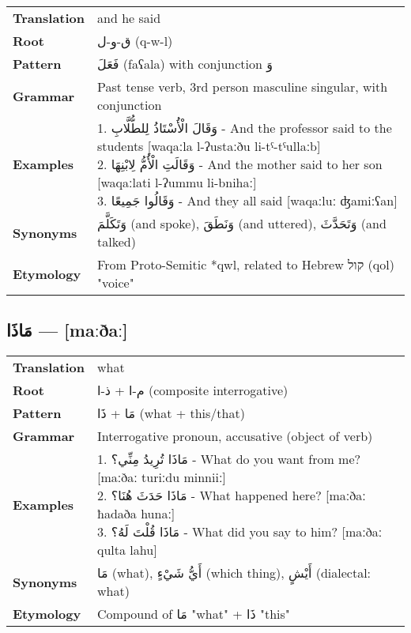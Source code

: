 \documentclass[letterpaper,12pt]{article}
\begin{document}
\begin{tabular}{p{3cm}p{10cm}}
\toprule
\textbf{Translation} & and he said \\
\textbf{Root} & \textarabic{ق-و-ل} (q-w-l) \\
\textbf{Pattern} & \textarabic{فَعَلَ} (faʕala) with conjunction \textarabic{وَ} \\
\textbf{Grammar} & Past tense verb, 3rd person masculine singular, with conjunction \\
\textbf{Examples} & \makecell[l]{\parbox{9.5cm}{
1. \textarabic{وَقَالَ الْأُسْتَاذُ لِلطُّلَّابِ} - And the professor said to the students [waqaːla l-ʔustaːðu li-tˤ-tˤullaːb]\\
2. \textarabic{وَقَالَتِ الْأُمُّ لِابْنِهَا} - And the mother said to her son [waqaːlati l-ʔummu li-bnihaː]\\
3. \textarabic{وَقَالُوا جَمِيعًا} - And they all said [waqaːluː ʤamiːʕan]
}} \\
\midrule
\textbf{Synonyms} & \textarabic{وَتَكَلَّمَ} (and spoke), \textarabic{وَنَطَقَ} (and uttered), \textarabic{وَتَحَدَّثَ} (and talked) \\
\textbf{Etymology} & From Proto-Semitic *qwl, related to Hebrew \texthebrew{קול} (qol) "voice" \\
\bottomrule
\end{tabular}

\subsection{\textarabic{مَاذَا} — [maːðaː]}

\begin{tabular}{p{3cm}p{10cm}}
\toprule
\textbf{Translation} & what \\
\textbf{Root} & \textarabic{م-ا} + \textarabic{ذ-ا} (composite interrogative) \\
\textbf{Pattern} & \textarabic{مَا} + \textarabic{ذَا} (what + this/that) \\
\textbf{Grammar} & Interrogative pronoun, accusative (object of verb) \\
\textbf{Examples} & \makecell[l]{\parbox{9.5cm}{
1. \textarabic{مَاذَا تُرِيدُ مِنِّي؟} - What do you want from me? [maːðaː turiːdu minniiː]\\
2. \textarabic{مَاذَا حَدَثَ هُنَا؟} - What happened here? [maːðaː ħadaða hunaː]\\
3. \textarabic{مَاذَا قُلْتَ لَهُ؟} - What did you say to him? [maːðaː qulta lahu]
}} \\
\midrule
\textbf{Synonyms} & \textarabic{مَا} (what), \textarabic{أَيُّ شَيْءٍ} (which thing), \textarabic{أَيْشٍ} (dialectal: what) \\
\textbf{Etymology} & Compound of \textarabic{مَا} "what" + \textarabic{ذَا} "this" \\
\bottomrule
\end{tabular}
\end{document}

